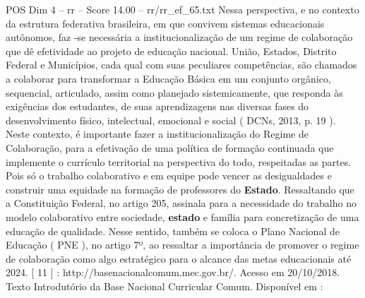 \begin{textsample}{POS Dim 4 – rr – Score 14.00 – rr/rr\_ef\_65.txt}
Nessa perspectiva, e no contexto da estrutura federativa brasileira, em que convivem sistemas educacionais autônomos, faz -se necessária a institucionalização de um regime de colaboração que dê efetividade ao projeto de educação nacional.
União, Estados, Distrito Federal e Municípios, cada qual com suas peculiares competências, são chamados a colaborar para transformar a Educação Básica em um conjunto orgânico, sequencial, articulado, assim como planejado sistemicamente, que responda às exigências dos estudantes, de suas aprendizagens nas diversas fases do desenvolvimento físico, intelectual, emocional e social ( DCNs, 2013, p. 19 ).
Neste contexto, é importante fazer a institucionalização do Regime de Colaboração, para a efetivação de uma política de formação continuada que implemente o currículo territorial na perspectiva do todo, respeitadas as partes.
Pois só o trabalho colaborativo e em equipe pode vencer as desigualdades e construir uma equidade na formação de professores do \textbf{Estado}.
Ressaltando que a Constituição Federal, no artigo 205, assinala para a necessidade do trabalho no modelo colaborativo entre sociedade, \textbf{estado} e família para concretização de uma educação de qualidade.
Nesse sentido, também se coloca o Plano Nacional de Educação ( PNE ), no artigo 7º, ao ressaltar a importância de promover o regime de colaboração como algo estratégico para o alcance das metas educacionais até 2024. [ 11 ] : http://basenacionalcomum.mec.gov.br/.
Acesso em 20/10/2018.
Texto Introdutório da Base Nacional Curricular Comum.
Disponível em :

\end{textsample}

